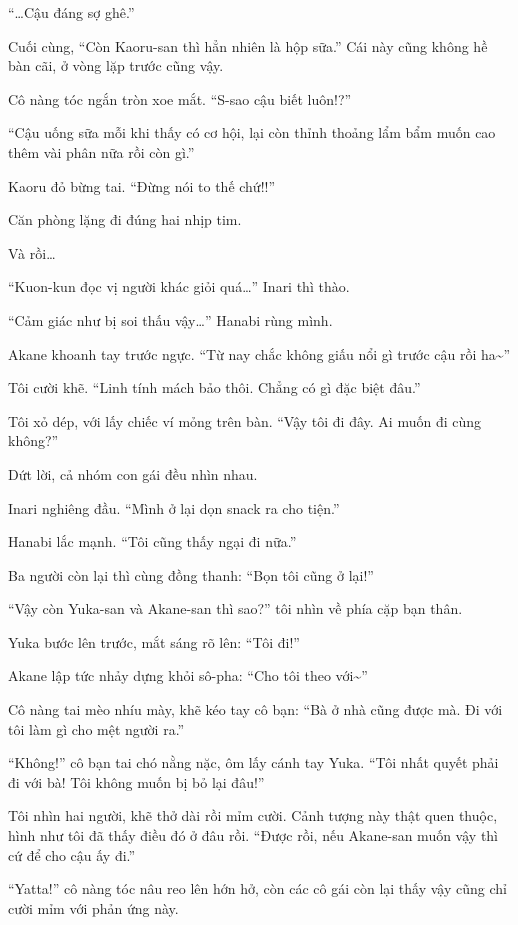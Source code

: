 \documentclass[../main.tex]{subfiles}
\begin{document}
``\dots Cậu đáng sợ ghê.''

Cuối cùng, ``Còn Kaoru-san thì hẳn nhiên là hộp sữa.'' Cái này cũng không hề bàn cãi, ở vòng lặp trước cũng vậy.

Cô nàng tóc ngắn tròn xoe mắt. ``S-sao cậu biết luôn!?''

``Cậu uống sữa mỗi khi thấy có cơ hội, lại còn thỉnh thoảng lẩm bẩm muốn cao thêm vài phân nữa rồi còn gì.''

Kaoru đỏ bừng tai. ``Đừng nói to thế chứ!!''

Căn phòng lặng đi đúng hai nhịp tim.

Và rồi\dots

``Kuon-kun đọc vị người khác giỏi quá\dots'' Inari thì thào.

``Cảm giác như bị soi thấu vậy\dots'' Hanabi rùng mình.

Akane khoanh tay trước ngực. ``Từ nay chắc không giấu nổi gì trước cậu rồi ha\~{}''

Tôi cười khẽ. ``Linh tính mách bảo thôi. Chẳng có gì đặc biệt đâu.''

Tôi xỏ dép, với lấy chiếc ví mỏng trên bàn. ``Vậy tôi đi đây. Ai muốn đi cùng không?''

Dứt lời, cả nhóm con gái đều nhìn nhau.

Inari nghiêng đầu. ``Mình ở lại dọn snack ra cho tiện.''

Hanabi lắc mạnh. ``Tôi cũng thấy ngại đi nữa.''

Ba người còn lại thì cùng đồng thanh: ``Bọn tôi cũng ở lại!''

``Vậy còn Yuka-san và Akane-san thì sao?'' tôi nhìn về phía cặp bạn thân.

Yuka bước lên trước, mắt sáng rõ lên: ``Tôi đi!''

Akane lập tức nhảy dựng khỏi sô-pha: ``Cho tôi theo với\~{}''

Cô nàng tai mèo nhíu mày, khẽ kéo tay cô bạn: ``Bà ở nhà cũng được mà. Đi với tôi làm gì cho mệt người ra.''

``Không!'' cô bạn tai chó nằng nặc, ôm lấy cánh tay Yuka. ``Tôi nhất quyết phải đi với bà! Tôi không muốn bị bỏ lại đâu!''

Tôi nhìn hai người, khẽ thở dài rồi mỉm cười. Cảnh tượng này thật quen thuộc, hình như tôi đã thấy điều đó ở đâu rồi. ``Được rồi, nếu Akane-san muốn vậy thì cứ để cho cậu ấy đi.''

``Yatta!'' cô nàng tóc nâu reo lên hớn hở, còn các cô gái còn lại thấy vậy cũng chỉ cười mỉm với phản ứng này.
\end{document}
